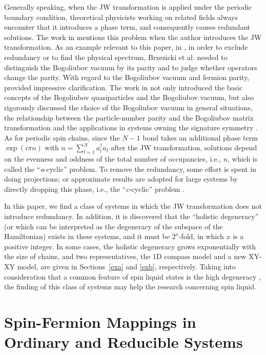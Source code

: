 \documentclass[twocolumn,floats,superscriptaddress]{revtex4}
\begin{document}
 {Generally speaking, when the JW transformation is applied under the periodic boundary condition, theoretical physicists working on related fields always encounter that it introduces a phase term, and consequently causes redundant solutions. The work in \cite{Mattis} mentions this problem when the author introduces the JW transformation. As an example relevant to this paper, in \cite{Brzezicki2007}, in order to exclude redundancy or to find the physical spectrum, Brzezicki et al. needed to distinguish the Bogoliubov vacuum by its parity and to judge whether operators change the parity. With regard to the Bogoliubov vacuum and fermion parity, \cite{Bertsch2009} provided impressive clarification. The work in \cite{Bertsch2009} not only introduced the basic concepts of the Bogoliubov quasiparticles and the Bogoliubov vacuum, but also rigorously discussed the choice of the Bogoliubov vacuum in general situations, the relationship between the particle-number parity and the Bogoliubov matrix transformation and the applications in systems owning the signature symmetry \cite{Bohr1975}.} As for periodic spin chains, since the $N-1$ bond takes an additional phase term {$\exp{(i\pi n)}$ with $n=\sum_{l=1}^{N}{a^\dag_{l}a_l}$ after the JW transformation}, {solutions depend on the evenness and oddness of the total number of {occupancies}}, {i.e., $n$}, which is called the ``\emph{a}-cyclic'' problem. To remove the redundancy, some effort is spent in doing projections; or {approximate results are} adopted for large systems {by directly dropping this phase}, i.e., the ``\emph{c}-cyclic'' problem \cite{Lieb1961}.

In this paper, we find a class of systems in which the JW transformation does not introduce redundancy. {In addition, it is discovered that the ``holistic degeneracy'' (or which can be interpreted as the degeneracy of the subspace of the Hamiltonian) exists in these systems, and it must be {$2^x$-fold, in which $x$ is a positive integer}. In some cases, the holistic degeneracy grows exponentially with the size of chains, and two representatives, the 1D compass model and a new XY-XY model, are given in Sections~\ref{exa} and \ref{exb}, respectively. Taking into consideration that a common feature of spin liquid states is the high degeneracy \cite{Balents2010}, the finding of this class of systems may help the research concerning spin liquid.}

\section{ {Spin-Fermion Mappings in Ordinary and Reducible Systems}}
\end{document}
